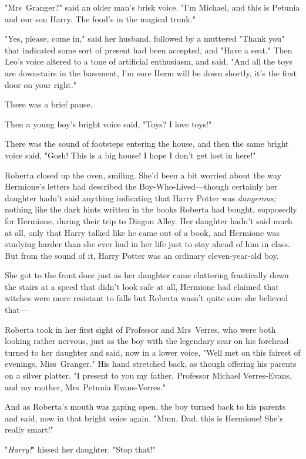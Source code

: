"Mrs~Granger?" said an older man's brisk voice. "I'm Michael, and this is
Petunia and our son Harry. The food's in the magical trunk."

"Yes, please, come in," said her husband, followed by a muttered "Thank you"
that indicated some sort of present had been accepted, and "Have a seat." Then
Leo's voice altered to a tone of artificial enthusiasm, and said, "And all the
toys are downstairs in the basement, I'm sure Herm will be down shortly, it's
the first door on your right."

There was a brief pause.

Then a young boy's bright voice said, "Toys? I love toys!"

There was the sound of footsteps entering the house, and then the same bright
voice said, "Gosh! This is a big house! I hope I don't get lost in here!"

Roberta closed up the oven, smiling. She'd been a bit worried about the way
Hermione's letters had described the Boy-Who-Lived—though certainly her
daughter hadn't said anything indicating that Harry Potter was
\emph{dangerous;} nothing like the dark hints written in the books Roberta had
bought, supposedly for Hermione, during their trip to Diagon Alley. Her
daughter hadn't said much at all, only that Harry talked like he came out of a
book, and Hermione was studying harder than she ever had in her life just to
stay ahead of him in class. But from the sound of it, Harry Potter was an
ordinary eleven-year-old boy.

She got to the front door just as her daughter came clattering frantically down
the stairs at a speed that didn't look safe at all, Hermione had claimed that
witches were more resistant to falls but Roberta wasn't quite sure she believed
that—

Roberta took in her first sight of Professor and Mrs~Verres, who were both
looking rather nervous, just as the boy with the legendary scar on his forehead
turned to her daughter and said, now in a lower voice, "Well met on this
fairest of evenings, Miss~Granger." His hand stretched back, as though offering
his parents on a silver platter. "I present to you my father, Professor Michael
Verres-Evans, and my mother, Mrs~Petunia Evans-Verres."

And as Roberta's mouth was gaping open, the boy turned back to his parents and
said, now in that bright voice again, "Mum, Dad, this is Hermione! She's really
smart!"

"\emph{Harry!}" hissed her daughter. "Stop that!"

